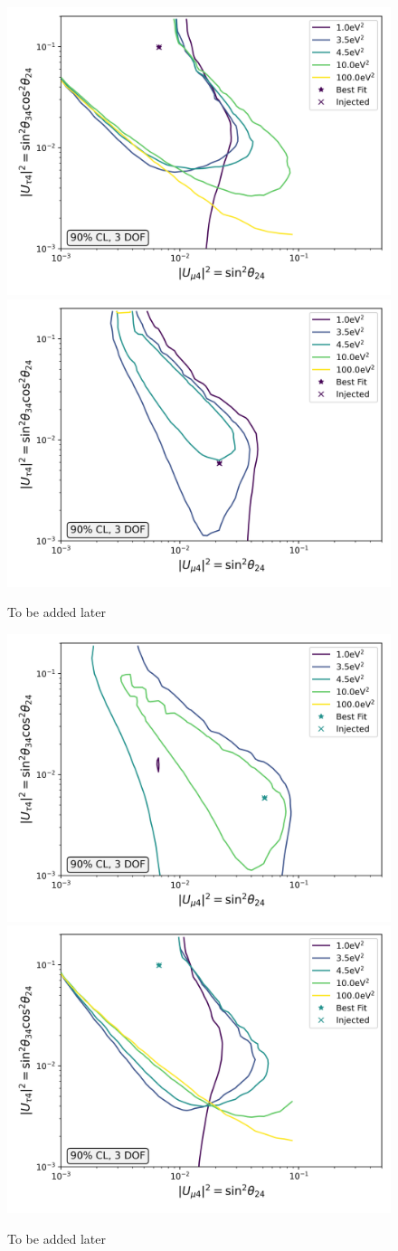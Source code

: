 \documentclass[main.tex]{subfiles}
\begin{document}
\begin{figure}
    \centering
    \includegraphics[width=0.45\linewidth]{figures/inject_recover_RealIR_0_sterile_1_cl0.9_dof3.png}%
    \includegraphics[width=0.45\linewidth]{figures/inject_recover_RealIR_1_sterile_1_cl0.9_dof3.png}
    \caption{To be added later}
\end{figure}

\begin{figure}
    \centering
    \includegraphics[width=0.45\linewidth]{figures/inject_recover_RealIR_2_sterile_4_cl0.9_dof3.png}%
    \includegraphics[width=0.45\linewidth]{figures/inject_recover_RealIR_3_sterile_4_cl0.9_dof3.png}
    \caption{To be added later}
\end{figure}
\end{document}
